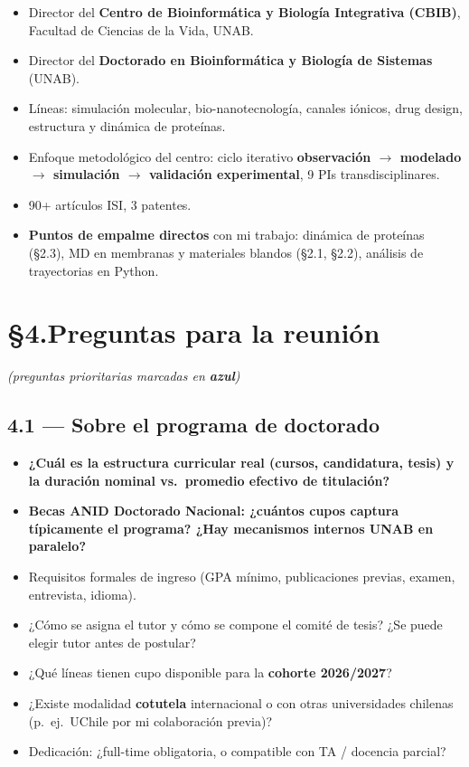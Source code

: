 \documentclass[11pt,a4paper]{article}
\newcommand{\pregunta}[1]{\item #1}
\newcommand{\prioritaria}[1]{\item \textbf{\textcolor{blue!70!black}{#1}}}
\begin{document}
\begin{itemize}
    \item Director del \textbf{Centro de Bioinformática y Biología Integrativa (CBIB)}, Facultad de Ciencias de la Vida, UNAB.
    \item Director del \textbf{Doctorado en Bioinformática y Biología de Sistemas} (UNAB).
    \item Líneas: simulación molecular, bio-nanotecnología, canales iónicos, drug design, estructura y dinámica de proteínas.
    \item Enfoque metodológico del centro: ciclo iterativo \textbf{observación $\rightarrow$ modelado $\rightarrow$ simulación $\rightarrow$ validación experimental}, 9 PIs transdisciplinares.
    \item 90+ artículos ISI, 3 patentes.
    \item \textbf{Puntos de empalme directos} con mi trabajo: dinámica de proteínas (\S2.3), MD en membranas y materiales blandos (\S2.1, \S2.2), análisis de trayectorias en Python.
\end{itemize}

\section*{\S4.\quad Preguntas para la reunión}
\textit{(preguntas prioritarias marcadas en \textbf{\textcolor{blue!70!black}{azul}})}

\subsection*{4.1 --- Sobre el programa de doctorado}
\begin{itemize}
    \prioritaria{¿Cuál es la \textbf{estructura curricular real} (cursos, candidatura, tesis) y la duración nominal vs.\ promedio efectivo de titulación?}
    \prioritaria{\textbf{Becas ANID Doctorado Nacional}: ¿cuántos cupos captura típicamente el programa? ¿Hay mecanismos internos UNAB en paralelo?}
    \pregunta{Requisitos formales de ingreso (GPA mínimo, publicaciones previas, examen, entrevista, idioma).}
    \pregunta{¿Cómo se asigna el tutor y cómo se compone el comité de tesis? ¿Se puede elegir tutor antes de postular?}
    \pregunta{¿Qué líneas tienen cupo disponible para la \textbf{cohorte 2026/2027}?}
    \pregunta{¿Existe modalidad \textbf{cotutela} internacional o con otras universidades chilenas (p.\ ej.\ UChile por mi colaboración previa)?}
    \pregunta{Dedicación: ¿full-time obligatoria, o compatible con TA / docencia parcial?}
\end{itemize}
\end{document}
